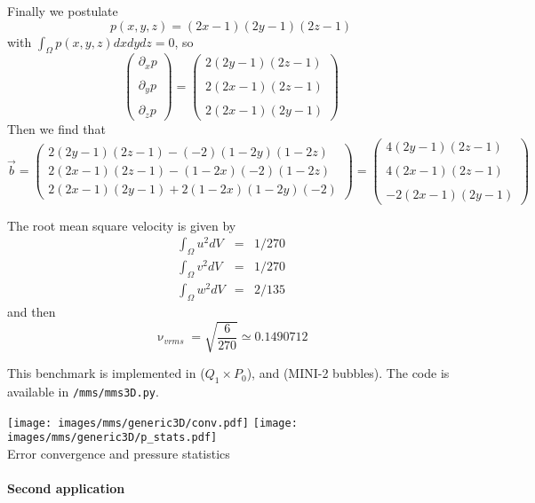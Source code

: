 Finally we postulate 
\[
p(x,y,z) = (2x-1)(2y-1)(2z-1)
\]
with $\int_\Omega p(x,y,z) dx dy dz =0$, so
\[ 
\left(
\begin{array}{c}
\partial_x p \\ \\
\partial_y p \\ \\
\partial_z p 
\end{array}
\right) 
=
\left(
\begin{array}{c}
2(2y-1)(2z-1) \\\\
2(2x-1)(2z-1) \\\\
2(2x-1)(2y-1) 
\end{array}
\right) 
\]
Then we find that 
\[
\vec{b}
=
\left(
\begin{array}{c}
2(2y-1)(2z-1) -(-2)(1-2y)(1-2z) \\
2(2x-1)(2z-1) -(1-2x)(-2)(1-2z) \\
2(2x-1)(2y-1) +2(1-2x)(1-2y)(-2)
\end{array}
\right)
=
\left(
\begin{array}{c}
4(2y-1)(2z-1)\\ \\
4(2x-1)(2z-1) \\ \\
-2(2x-1)(2y-1) 
\end{array}
\right)
\]


The root mean square velocity is given by 
\begin{eqnarray}
\int_\Omega u^2 dV &=& 1/270 \\
\int_\Omega v^2 dV &=& 1/270 \\
\int_\Omega w^2 dV &=& 2/135
\end{eqnarray}
and then 
\[
\upnu_{vrms} =\sqrt{\frac{6}{270}} \simeq 0.1490712
\]

This benchmark is implemented in  ($Q_1\times P_0$), 
and  (MINI-2 bubbles).  
The code is available in {\tt /mms/mms3D.py}.

\begin{center}
\texttt{[image: images/mms/generic3D/conv.pdf]}
\texttt{[image: images/mms/generic3D/p\_stats.pdf]}\\
{\captionfont Error convergence and pressure statistics}
\end{center}

\paragraph{Second application}

